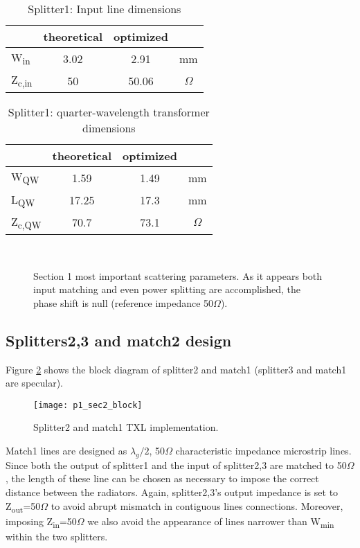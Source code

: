 \begin{table} [H]
	\label{tab:p1_sec1DimIN}
	\caption{Splitter1: Input line dimensions}
	\centering	
	\begin{tabular}{lccc} 
		\toprule
			& theoretical & optimized&\\
		\midrule 
		W\textsubscript{in} 	&	3.02		&	2.91	 & mm 		\\
		Z\textsubscript{c,in}	& 	50 			& 50.06		&$\Omega$ \\
		\bottomrule
	\end{tabular}	
\end{table}
\begin{table} [H]
	\label{tab:p1_sec1DimQW}
	\caption{Splitter1: quarter-wavelength transformer dimensions}
	\centering	
	\begin{tabular}{lccc} 
		\toprule
		& theoretical & optimized&\\
		\midrule 
		W\textsubscript{QW} 	&	1.59		&	1.49	& mm		\\
		L\textsubscript{QW}	&	17.25		& 	17.3		& mm	\\ 
		Z\textsubscript{c,QW}& 	70.7 &73.1	&$\Omega$ \\
		\bottomrule
	\end{tabular}	
\end{table}
\begin{figure}[p] 
	\centering
	\quad
	\\
	\caption{Section 1 most important scattering parameters. As it appears both input matching and even power splitting are accomplished, the phase shift is null (reference impedance 50$\Omega$).}
	\label{fig:p1_sec1Scatt}
\end{figure}
\newpage

\subsection{Splitters2,3 and match2 design}

Figure \ref{fig:p1_sec2_block} shows the block diagram of splitter2 and match1 (splitter3  and match1 are specular).
\begin{figure}[H] 
	\centering
	\texttt{[image: p1\_sec2\_block]}
	\caption{Splitter2 and match1 TXL implementation. }
	\label{fig:p1_sec2_block}
\end{figure}
Match1 lines are designed as $\lambda_{g}/2$, 50$\Omega$ characteristic impedance microstrip lines. Since both the output of splitter1 and the input of splitter2,3 are matched to 50$\Omega$, the length of these line can be chosen as necessary to impose the correct distance between the radiators. Again, splitter2,3's output impedance is set to Z\textsubscript{out}=50$\Omega$ to avoid abrupt mismatch in contiguous lines connections. Moreover, imposing Z\textsubscript{in}=50$\Omega$ we also avoid the appearance of lines narrower than W\textsubscript{min} within the two splitters.

